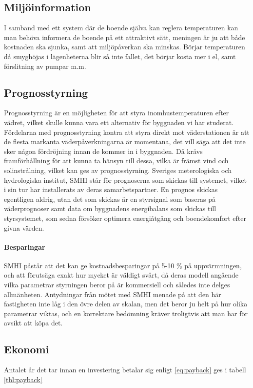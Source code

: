\subsection{Miljöinformation}
I samband med ett system där de boende själva kan reglera temperaturen kan man behöva informera de boende på ett attraktivt sätt, meningen är ju att både kostnaden ska sjunka, samt att miljöpåverkan ska minskas. Börjar temperaturen då smyghöjas i lägenheterna blir så inte fallet, det börjar kosta mer i el, samt förslitning av pumpar m.m.  \cite{viivilla}


\subsection{Prognosstyrning}
Prognosstyrning är en möjligheten för att styra inomhustemperaturen efter vädret, vilket skulle kunna vara ett alternativ för byggnaden vi har studerat.
Fördelarna med prognosstyrning kontra att styra direkt mot väderstationen är att de flesta markanta väderpåverkningarna är momentana, det vill säga att det inte sker någon fördröjning innan de kommer in i byggnaden. Då krävs framförhållning för att kunna ta hänsyn till dessa, vilka är främst vind och solinstrålning, vilket kan ges av prognosstyrning. Sveriges meterologiska och hydrologiska institut, SMHI står för prognoserna som skickas till systemet, vilket i sin tur har installerats av deras samarbetspartner. En prognos skickas egentligen aldrig, utan det som skickas är en styrsignal som baseras på väderprognoser samt data om byggnadens energibalans som skickas till styrsystemet, som sedna försöker optimera energiåtgång och boendekomfort efter givna värden.

\paragraph{Besparingar}
SMHI påstår att det kan ge kostnadsbesparingar på 5-10 \% på uppvärmningen, och att förutsäga exakt hur mycket är väldigt svårt, då deras modell angående vilka parametrar styrningen beror på är kommersiell och således inte delges allmänheten. Antydningar från mötet med SMHI menade på att den här fastigheten inte låg i den övre delen av skalan, men det beror ju helt på hur olika parametrar viktas, och en korrektare bedömning kräver troligtvis att man har för avsikt att köpa det.

\subsection{Ekonomi}
Antalet år det tar innan en investering betalar sig enligt \ref{eq:payback} ges i tabell \ref{tbl:payback}

